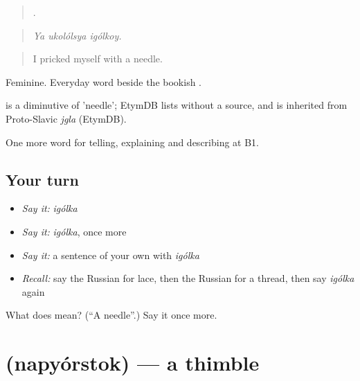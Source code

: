 \begin{quote}
  .
\end{quote}

\begin{quote}
\emph{Ya ukolólsya igólkoy.}
\end{quote}

\begin{quote}
I pricked myself with a needle.
\end{quote}

Feminine. Everyday word beside the bookish \emph{}.

\begin{cousinweb}
\emph{} is a diminutive of \emph{} 'needle'; EtymDB lists \emph{} without a source, and \emph{} is inherited from Proto-Slavic \emph{jgla} (EtymDB).
\end{cousinweb}

\begin{grammarlens}[title={What you've built}]
One more word for telling, explaining and describing at B1.
\end{grammarlens}

\subsection*{Your turn}
\begin{itemize}
\raggedright
  \item \emph{Say it:} \emph{igólka}
  \item \emph{Say it:} \emph{igólka}, once more
  \item \emph{Say it:} a sentence of your own with \emph{igólka}
  \item \emph{Recall:} say the Russian for lace, then the Russian for a thread, then say \emph{igólka} again
\end{itemize}

\begin{tcolorbox}[breakable,colback=teal!4,colframe=teal!35!black,title={Before you move on}]
What does  mean? (\textquotedblleft{}A needle\textquotedblright{}.) Say it once more.
\end{tcolorbox}
\section[\texorpdfstring{\ru{напёрсток} (napyórstok)}{напёрсток (napyórstok)}]{ (napyórstok) — a thimble}

